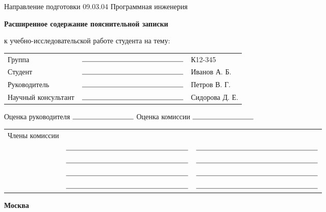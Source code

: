 \pagestyle{empty}


\vfill

\begin{center}
  Направление подготовки 09.03.04 Программная инженерия

  \vfill

  {\Large{\textbf{Расширенное содержание пояснительной записки}}}

  к учебно-исследовательской работе студента на тему:

  {\Large\thetitle}
\end{center}

\vfill

{\large

\noindent
\begin{tabular}{@{}lcl@{}}
Группа              & $\rule{5cm}{0.15mm}$ & К12-345 \\   
Студент             & $\rule{5cm}{0.15mm}$ & Иванов А. Б. \\    
Руководитель        & $\rule{5cm}{0.15mm}$ & Петров В. Г. \\         
Научный консультант & $\rule{5cm}{0.15mm}$ & Сидорова Д. Е. \\                
\end{tabular}

\vfill

\noindent
Оценка руководителя \quad $\rule{3cm}{0.15mm}$ \quad
Оценка комиссии     \quad $\rule{3cm}{0.15mm}$

\vfill

\noindent
\begin{tabular}{@{}lcc@{}}
Члены комиссии & & \\
& $\rule{6cm}{0.15mm}$ & $\rule{6cm}{0.15mm}$ \\
& $\rule{6cm}{0.15mm}$ & $\rule{6cm}{0.15mm}$ \\
& $\rule{6cm}{0.15mm}$ & $\rule{6cm}{0.15mm}$ \\
& $\rule{6cm}{0.15mm}$ & $\rule{6cm}{0.15mm}$ \\
\end{tabular}

\vfill

\begin{center}
\textbf{Москва \the\year}
\end{center}

}
